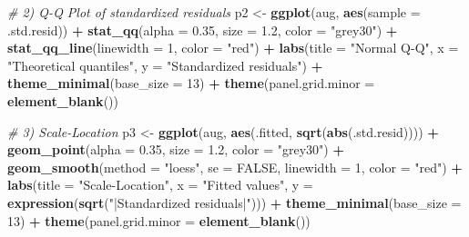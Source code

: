 \documentclass[
]{article}
\newenvironment{Shaded}{\begin{snugshade}}{\end{snugshade}}
\newcommand{\AttributeTok}[1]{\textcolor[rgb]{0.13,0.29,0.53}{#1}}
\newcommand{\CommentTok}[1]{\textcolor[rgb]{0.56,0.35,0.01}{\textit{#1}}}
\newcommand{\ConstantTok}[1]{\textcolor[rgb]{0.56,0.35,0.01}{#1}}
\newcommand{\DecValTok}[1]{\textcolor[rgb]{0.00,0.00,0.81}{#1}}
\newcommand{\FloatTok}[1]{\textcolor[rgb]{0.00,0.00,0.81}{#1}}
\newcommand{\FunctionTok}[1]{\textcolor[rgb]{0.13,0.29,0.53}{\textbf{#1}}}
\newcommand{\NormalTok}[1]{#1}
\newcommand{\OtherTok}[1]{\textcolor[rgb]{0.56,0.35,0.01}{#1}}
\newcommand{\SpecialCharTok}[1]{\textcolor[rgb]{0.81,0.36,0.00}{\textbf{#1}}}
\newcommand{\StringTok}[1]{\textcolor[rgb]{0.31,0.60,0.02}{#1}}
\begin{document}
\begin{Shaded}
\begin{Highlighting}[]
\CommentTok{\# 2) Q{-}Q Plot of standardized residuals}
\NormalTok{p2 }\OtherTok{\textless{}{-}} \FunctionTok{ggplot}\NormalTok{(aug, }\FunctionTok{aes}\NormalTok{(}\AttributeTok{sample =}\NormalTok{ .std.resid)) }\SpecialCharTok{+}
  \FunctionTok{stat\_qq}\NormalTok{(}\AttributeTok{alpha =} \FloatTok{0.35}\NormalTok{, }\AttributeTok{size =} \FloatTok{1.2}\NormalTok{, }\AttributeTok{color =} \StringTok{"grey30"}\NormalTok{) }\SpecialCharTok{+}
  \FunctionTok{stat\_qq\_line}\NormalTok{(}\AttributeTok{linewidth =} \DecValTok{1}\NormalTok{, }\AttributeTok{color =} \StringTok{"red"}\NormalTok{) }\SpecialCharTok{+}
  \FunctionTok{labs}\NormalTok{(}\AttributeTok{title =} \StringTok{"Normal Q{-}Q"}\NormalTok{, }\AttributeTok{x =} \StringTok{"Theoretical quantiles"}\NormalTok{, }\AttributeTok{y =} \StringTok{"Standardized residuals"}\NormalTok{) }\SpecialCharTok{+}
  \FunctionTok{theme\_minimal}\NormalTok{(}\AttributeTok{base\_size =} \DecValTok{13}\NormalTok{) }\SpecialCharTok{+}
  \FunctionTok{theme}\NormalTok{(}\AttributeTok{panel.grid.minor =} \FunctionTok{element\_blank}\NormalTok{())}

\CommentTok{\# 3) Scale{-}Location}
\NormalTok{p3 }\OtherTok{\textless{}{-}} \FunctionTok{ggplot}\NormalTok{(aug, }\FunctionTok{aes}\NormalTok{(.fitted, }\FunctionTok{sqrt}\NormalTok{(}\FunctionTok{abs}\NormalTok{(.std.resid)))) }\SpecialCharTok{+}
  \FunctionTok{geom\_point}\NormalTok{(}\AttributeTok{alpha =} \FloatTok{0.35}\NormalTok{, }\AttributeTok{size =} \FloatTok{1.2}\NormalTok{, }\AttributeTok{color =} \StringTok{"grey30"}\NormalTok{) }\SpecialCharTok{+}
  \FunctionTok{geom\_smooth}\NormalTok{(}\AttributeTok{method =} \StringTok{"loess"}\NormalTok{, }\AttributeTok{se =} \ConstantTok{FALSE}\NormalTok{, }\AttributeTok{linewidth =} \DecValTok{1}\NormalTok{, }\AttributeTok{color =} \StringTok{"red"}\NormalTok{) }\SpecialCharTok{+}
  \FunctionTok{labs}\NormalTok{(}\AttributeTok{title =} \StringTok{"Scale{-}Location"}\NormalTok{, }\AttributeTok{x =} \StringTok{"Fitted values"}\NormalTok{, }\AttributeTok{y =} \FunctionTok{expression}\NormalTok{(}\FunctionTok{sqrt}\NormalTok{(}\StringTok{"|Standardized residuals|"}\NormalTok{))) }\SpecialCharTok{+}
  \FunctionTok{theme\_minimal}\NormalTok{(}\AttributeTok{base\_size =} \DecValTok{13}\NormalTok{) }\SpecialCharTok{+}
  \FunctionTok{theme}\NormalTok{(}\AttributeTok{panel.grid.minor =} \FunctionTok{element\_blank}\NormalTok{())}


\end{Highlighting}
\end{Shaded}
\end{document}
